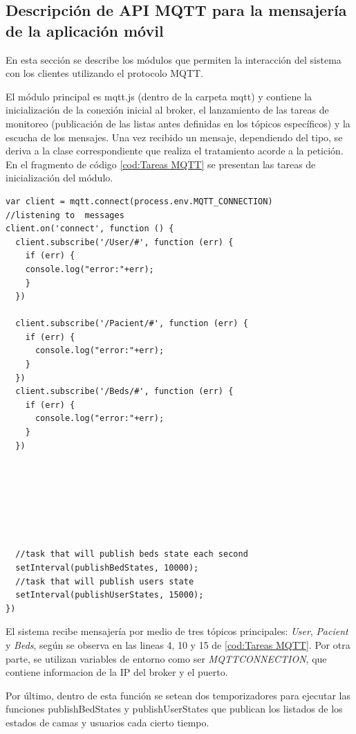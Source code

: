\subsection{Descripción de API MQTT para la mensajería de la aplicación móvil}

En esta sección se describe los módulos que permiten la interacción del sistema con los clientes utilizando el protocolo MQTT.


El módulo principal es mqtt.js (dentro de la carpeta mqtt) y contiene la inicialización de la conexión inicial al broker, el lanzamiento de las tareas de monitoreo (publicación de las listas antes definidas en los tópicos específicos) y la escucha de los mensajes. Una vez recibido un mensaje, dependiendo del tipo, se deriva a la clase correspondiente que realiza el tratamiento acorde a la petición. En el fragmento de código  \ref{cod:Tareas MQTT} se presentan las tareas de inicialización del módulo.



\begin{lstlisting}[label=cod:Tareas MQTT,caption=  Tareas ejecutadas por mqtt.js.]
var client = mqtt.connect(process.env.MQTT_CONNECTION)
//listening to  messages
client.on('connect', function () {
  client.subscribe('/User/#', function (err) {
    if (err) {
    console.log("error:"+err);
    }
  })

  client.subscribe('/Pacient/#', function (err) {
    if (err) {      
      console.log("error:"+err);
    }
  })
  client.subscribe('/Beds/#', function (err) {
    if (err) {      
      console.log("error:"+err);
    }
  })







  //task that will publish beds state each second
  setInterval(publishBedStates, 10000);
  //task that will publish users state 
  setInterval(publishUserStates, 15000);
})
\end{lstlisting}

El sistema recibe mensajería por medio de tres tópicos principales: \textit{User}, \textit{Pacient} y \textit{Beds}, según se observa en las lineas 4, 10 y 15 de \ref{cod:Tareas MQTT}. Por otra parte, se utilizan variables de entorno como ser \textit{MQTT\textunderscore CONNECTION}, que contiene informacion de la IP del broker y el puerto.

Por último, dentro de esta función se setean dos temporizadores para ejecutar las funciones publishBedStates y publishUserStates que publican los listados de los estados de camas y usuarios cada cierto tiempo.




